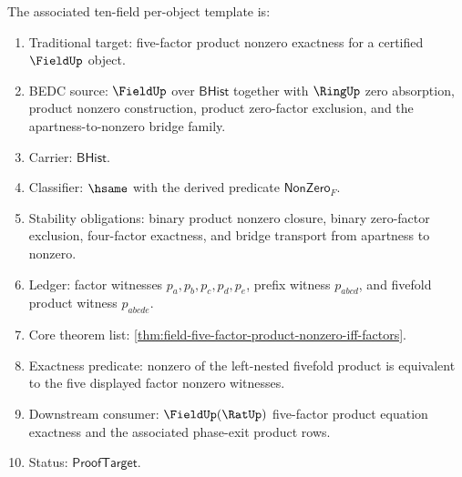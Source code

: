 The associated ten-field per-object template is:
\begin{enumerate}
  \item Traditional target: five-factor product nonzero exactness for a
  certified $\FieldUp$ object.
  \item BEDC source: $\FieldUp$ over $\mathsf{BHist}$ together with
  $\RingUp$ zero absorption, product nonzero construction, product zero-factor
  exclusion, and the apartness-to-nonzero bridge family.
  \item Carrier: $\mathsf{BHist}$.
  \item Classifier: $\hsame$ with the derived predicate
  $\mathsf{NonZero}_F$.
  \item Stability obligations: binary product nonzero closure, binary
  zero-factor exclusion, four-factor exactness, and bridge transport from
  apartness to nonzero.
  \item Ledger: factor witnesses $p_a,p_b,p_c,p_d,p_e$, prefix witness
  $p_{abcd}$, and fivefold product witness $p_{abcde}$.
  \item Core theorem list:
  \autoref{thm:field-five-factor-product-nonzero-iff-factors}.
  \item Exactness predicate: nonzero of the left-nested fivefold product is
  equivalent to the five displayed factor nonzero witnesses.
  \item Downstream consumer: $\FieldUp(\RatUp)$ five-factor product equation
  exactness and the associated phase-exit product rows.
  \item Status: $\mathsf{ProofTarget}$.
\end{enumerate}
